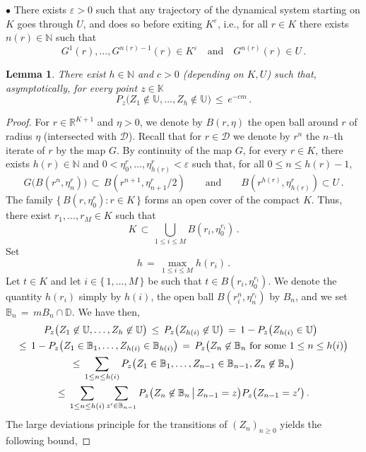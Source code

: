 \documentclass[a4paper,12pt]{article}
\newtheorem{lemma}[theorem]{Lemma}
\theoremstyle{definition}
\theoremstyle{remark}
\def \cD {\mathcal{D}}
\def \e {\varepsilon}
\def \B {\mathbb{B}}
\def \dD {\mathbb{D}}
\def \K {\mathbb{K}}
\def \N {\mathbb{N}}
\def \R {\mathbb{R}}
\def \dU {\mathbb{U}}
\begin{document}
$\bullet$ There exists $\e>0$ such that any trajectory of the dynamical system starting on $K$ goes through $U$,
and does so before exiting $K^\e$, i.e., for all $r\in K$ there exists $n(r)\in\N$ such that
$$G^1(r),\dots,G^{n(r)-1}(r)\in K^\e\quad\text{and}\quad G^{n(r)}(r)\in U\,.$$
\begin{lemma}\label{timefar1}
There exist $h\in\N$
and $c>0$ (depending on $K,U$) such that, asymptotically, for every point $z\in\K$ 
$$P_{z}\Big(
Z_1\not\in \dU,\dots,Z_{h}\not\in \dU
\Big)\,\leq\,
e^{-cm}\,.$$
\end{lemma}
\begin{proof}
For $r\in\R^{K+1}$ and $\eta>0$,
we denote by $B(r,\eta)$ the open ball around $r$ of radius $\eta$ (intersected with $\cD$).
Recall that for $r\in\cD$ we denote by $r^n$ the $n$--th
iterate of $r$ by the map $G$. 
By continuity of the map $G$,
for every $r\in K$,
there exists $h(r)\in\N$ and $0<\eta^r_0,\dots,\eta^r_{h(r)}<\e$ such that,
for all $0\leq n\leq h(r)-1$,
$$
G\big(
B(r^n,\eta^r_n)
\big)\,\subset\,B(r^{n+1},\eta^r_{n+1}/2)\qquad
\text{and}\qquad
B(r^{h(r)},\eta^r_{h(r)})\subset U\,.$$
The family $\lbrace\,
B(r,\eta_0^r):r\in K
\,\rbrace$
forms an open cover of the compact $K$.
Thus, there exist $r_1,\dots,r_M\in K$ such that
$$K\,\subset\, \bigcup_{1\leq i\leq M}
B(r_i,\eta_0^{r_i})\,.$$
Set
$$h\,=\,\max_{1\leq i\leq M} h(r_i)\,.$$
Let $t\in K$ 
and let $i\in\lbrace\,1,\dots,M\,\rbrace$
be such that $t\in B(r_{i},\eta^{r_{i}}_0)$.
We denote the quantity $h(r_i)$ simply by $h(i)$, the open ball $B(r_{i}^n,\eta^{r_{i}}_n)$
by $B_n$,
and we set $\B_n\,=\,mB_n\cap\dD$.
We have then,
\begin{multline*}
\hspace{-6pt}
P_{z}\big(
Z_1\not\in \dU,\dots,Z_{h}\not\in \dU
\big)\,
\leq\,P_{z}\big(
Z_{h(i)}\not\in \dU
\big)\,
=\,1-P_{z}\big(
Z_{h(i)}\in\dU
\big)\\
\leq\,1-P_{z}\big(
Z_1\in \B_1,\dots,Z_{h(i)}\in\B_{h(i)}
\big)
\,=\,P_{z}\big(%
Z_n\not\in \B_n
\ \text{for some}\ 1\leq n\leq h(i)
\big)\\
\leq\,
\sum_{1\leq n\leq h(i)}
P_{z}\big(Z_1\in \B_1,\dots,
Z_{n-1}\in \B_{n-1},
Z_n\not\in \B_n
\big)\\
\leq\,
\sum_{1\leq n\leq h(i)}
\sum_{z'\in \B_{n-1}}P_{z}\big(
Z_n\not\in  \B_n\,\big|\,
Z_{n-1}=z
\big)P_{z}\big(
Z_{n-1}=z'
\big)\,.
\end{multline*}
The large deviations principle for the transitions of $(Z_n)_{n\geq0}$
yields the following bound,

\end{proof}
\end{document}
